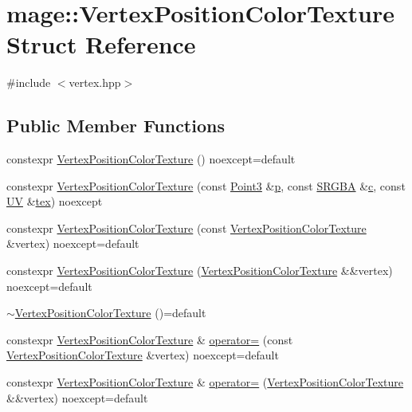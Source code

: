 \hypertarget{structmage_1_1_vertex_position_color_texture}{}\section{mage\+:\+:Vertex\+Position\+Color\+Texture Struct Reference}
\label{structmage_1_1_vertex_position_color_texture}


{\ttfamily \#include $<$vertex.\+hpp$>$}

\subsection*{Public Member Functions}
\begin{DoxyCompactItemize}
\item 
constexpr \hyperlink{structmage_1_1_vertex_position_color_texture_a435db808d87294838ec008221970ea61}{Vertex\+Position\+Color\+Texture} () noexcept=default
\item 
constexpr \hyperlink{structmage_1_1_vertex_position_color_texture_a95ed2d8086958400101221c93c11e57a}{Vertex\+Position\+Color\+Texture} (const \hyperlink{structmage_1_1_point3}{Point3} \&\hyperlink{structmage_1_1_vertex_position_color_texture_a145c2e2fce90b07252b778b46e31ea24}{p}, const \hyperlink{structmage_1_1_s_r_g_b_a}{S\+R\+G\+BA} \&\hyperlink{structmage_1_1_vertex_position_color_texture_a74c470e36536a800657daef6de1e8e9f}{c}, const \hyperlink{structmage_1_1_u_v}{UV} \&\hyperlink{structmage_1_1_vertex_position_color_texture_adfbaa105e46bb65f502ec33eaa2e8b15}{tex}) noexcept
\item 
constexpr \hyperlink{structmage_1_1_vertex_position_color_texture_a2c24e04c0544101502c60e1887f6e170}{Vertex\+Position\+Color\+Texture} (const \hyperlink{structmage_1_1_vertex_position_color_texture}{Vertex\+Position\+Color\+Texture} \&vertex) noexcept=default
\item 
constexpr \hyperlink{structmage_1_1_vertex_position_color_texture_ab0243c548e3a9f8b13481873244c5ec3}{Vertex\+Position\+Color\+Texture} (\hyperlink{structmage_1_1_vertex_position_color_texture}{Vertex\+Position\+Color\+Texture} \&\&vertex) noexcept=default
\item 
\hyperlink{structmage_1_1_vertex_position_color_texture_a07cc697a88ef1a75ef64aadac9945c11}{$\sim$\+Vertex\+Position\+Color\+Texture} ()=default
\item 
constexpr \hyperlink{structmage_1_1_vertex_position_color_texture}{Vertex\+Position\+Color\+Texture} \& \hyperlink{structmage_1_1_vertex_position_color_texture_a1107e506bac58213e80035f85d3e0819}{operator=} (const \hyperlink{structmage_1_1_vertex_position_color_texture}{Vertex\+Position\+Color\+Texture} \&vertex) noexcept=default
\item 
constexpr \hyperlink{structmage_1_1_vertex_position_color_texture}{Vertex\+Position\+Color\+Texture} \& \hyperlink{structmage_1_1_vertex_position_color_texture_adbfea7798323727998fff85ba253bd7a}{operator=} (\hyperlink{structmage_1_1_vertex_position_color_texture}{Vertex\+Position\+Color\+Texture} \&\&vertex) noexcept=default
\end{DoxyCompactItemize}
